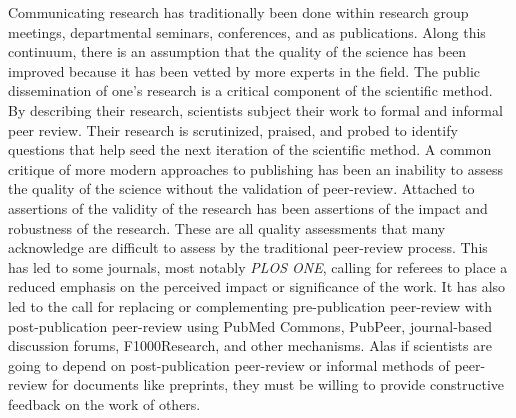 \documentclass[11pt,]{article}
\begin{document}
Communicating research has traditionally been done within research group
meetings, departmental seminars, conferences, and as publications. Along
this continuum, there is an assumption that the quality of the science
has been improved because it has been vetted by more experts in the
field. The public dissemination of one's research is a critical
component of the scientific method. By describing their research,
scientists subject their work to formal and informal peer review. Their
research is scrutinized, praised, and probed to identify questions that
help seed the next iteration of the scientific method. A common critique
of more modern approaches to publishing has been an inability to assess
the quality of the science without the validation of peer-review.
Attached to assertions of the validity of the research has been
assertions of the impact and robustness of the research. These are all
quality assessments that many acknowledge are difficult to assess by the
traditional peer-review process. This has led to some journals, most
notably \emph{PLOS ONE}, calling for referees to place a reduced
emphasis on the perceived impact or significance of the work. It has
also led to the call for replacing or complementing pre-publication
peer-review with post-publication peer-review using PubMed Commons,
PubPeer, journal-based discussion forums, F1000Research, and other
mechanisms. Alas if scientists are going to depend on post-publication
peer-review or informal methods of peer-review for documents like
preprints, they must be willing to provide constructive feedback on the
work of others.
\end{document}
